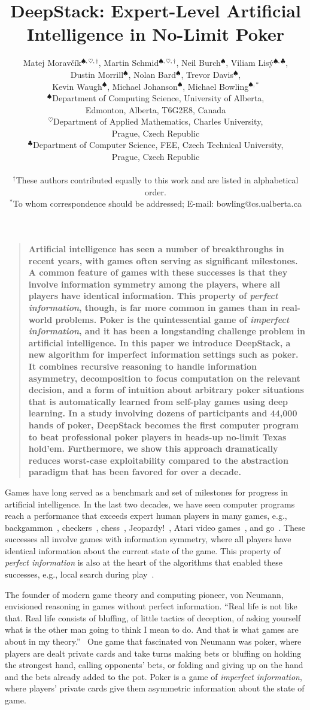 \documentclass[12pt]{article}
\title{DeepStack: Expert-Level Artificial Intelligence in No-Limit Poker}
\author{
Matej Morav\v{c}\'{i}k$^{\spadesuit,\heartsuit,\dag}$, Martin Schmid$^{\spadesuit,\heartsuit,\dag}$, 
Neil Burch$^\spadesuit$, Viliam Lis\'y$^{\spadesuit,\clubsuit}$, \\
Dustin Morrill$^\spadesuit$, Nolan Bard$^\spadesuit$, Trevor Davis$^\spadesuit$, \\
Kevin Waugh$^\spadesuit$, Michael Johanson$^\spadesuit$, Michael Bowling$^{\spadesuit,\ast}$ \\
\normalsize{$^{\spadesuit}$Department of Computing Science, University of Alberta,}\\
\normalsize{Edmonton, Alberta, T6G2E8, Canada}\\
\normalsize{$^{\heartsuit}$Department of Applied Mathematics, Charles University,}\\
\normalsize{Prague, Czech Republic}\\
\normalsize{$^{\clubsuit}$Department of Computer Science, FEE, Czech Technical University,}\\
\normalsize{Prague, Czech Republic}\\
\\
\normalsize{$^\dag$These authors contributed equally to this work and are listed in alphabetical order.}
\\
\normalsize{$^\ast$To whom correspondence should be addressed; E-mail:  bowling@cs.ualberta.ca}
}
\date{}
\newenvironment{sciabstract}{%
\begin{quote} \bf}
{\end{quote}}
\begin{document}
 
\maketitle 

\begin{sciabstract}
Artificial intelligence has seen a number of breakthroughs in recent years, with games often serving as significant milestones.  A common feature of games with these successes is that they involve information symmetry among the players, where all players have identical information.  This property of {\em perfect information}, though, is far more common in games than in real-world problems.  Poker is the quintessential game of {\em imperfect information}, and it has been a longstanding challenge problem in artificial intelligence.  In this paper we introduce DeepStack, a new algorithm for imperfect information settings such as poker. It combines recursive reasoning to handle information asymmetry, decomposition to focus computation on the relevant decision, and a form of intuition about arbitrary poker situations that is automatically learned from self-play games using deep learning.  In a study involving dozens of participants and 44,000 hands of poker, DeepStack becomes the first computer program to beat professional poker players in heads-up no-limit Texas hold'em.  Furthermore, we show this approach dramatically reduces worst-case exploitability compared to the abstraction paradigm that has been favored for over a decade.
\end{sciabstract}

Games have long served as a benchmark and set of milestones for progress in artificial intelligence.  
In the last two decades, we have seen computer programs reach a performance that exceeds expert human players in many games, e.g., backgammon~\cite{Tesauro95}, checkers~\cite{SchaefferEtAl96}, chess~\cite{CampbellEtAl02}, Jeopardy!~\cite{Ferucci12}, Atari video games~\cite{Mnih15:DQN}, and go~\cite{Silver16:AlphaGo}.
These successes all involve games with information symmetry, where all players have identical information about the current state of the game.
This property of {\em perfect information} is also at the heart of the algorithms that enabled these successes, e.g., local search during play~\cite{Samuel:AlphaBeta,Kocsis06:UCT}.

The founder of modern game theory and computing pioneer, von Neumann, envisioned reasoning in games without perfect information. ``Real life is not like that.  Real life consists of bluffing, of little tactics of deception, of asking yourself what is the other man going to think I mean to do.  And that is what games are about in my theory.''~\cite{Bronowski73}
One game that fascinated von Neumann was poker, where players are dealt private cards and take turns making bets or bluffing on holding the strongest hand, calling opponents' bets, or folding and giving up on the hand and the bets already added to the pot.
Poker is a game of {\em imperfect information}, where players' private cards give them asymmetric information about the state of game.
\end{document}
